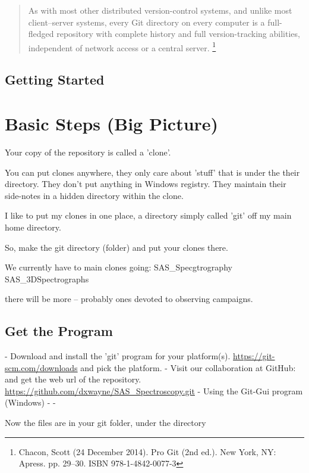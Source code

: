 \documentclass[letter,11pt,oneside]{article}
\newcommand{\dhl}[1]{{\color{verbcolor}{\texttt#1}}}
\begin{document}
\begin{quote}
As with most other distributed version-control systems, and unlike
most client--server systems, every Git directory on every computer is
a full-fledged repository with complete history and full
version-tracking abilities, independent of network access or a central
server. \footnote{Chacon, Scott (24 December 2014). Pro Git (2nd
  ed.). New York, NY: Apress. pp. 29--30. ISBN 978-1-4842-0077-3}
\end{quote}

\subsection{Getting Started}

\appendix
\renewcommand \thesection{\Alph{section}}

\section{Basic Steps (Big Picture)}

Your copy of the repository is called a 'clone'.

You can put clones anywhere, they only care about 'stuff'
that is under the their directory. They don't put anything
in Windows registry. They maintain their side-notes in
a hidden directory within the clone.

I like to put my clones in one place, a directory simply
called 'git' off my main home directory. 

So, make the git directory (folder) and put your clones there.

We currently have to main clones going:
  SAS\_Specgtrography \\
  SAS\_3DSpectrographs

there will be more -- probably ones devoted to observing campaigns.

\subsection{Get the Program}

- Download and install the 'git' program for your platform(s).
 \url{https://git-scm.com/downloads} and pick the platform.
- Visit our collaboration at GitHub: and get the web url of
the repository. \url{https://github.com/dxwayne/SAS_Spectroscopy.git}
- Using the Git-Gui program (Windows)
  - 
  -

Now the files are in your git folder, under the directory
\dhl{SAS\_Specgtrography/Observations/SampleDatasets/LISA/V694 Mon}
\end{document}
